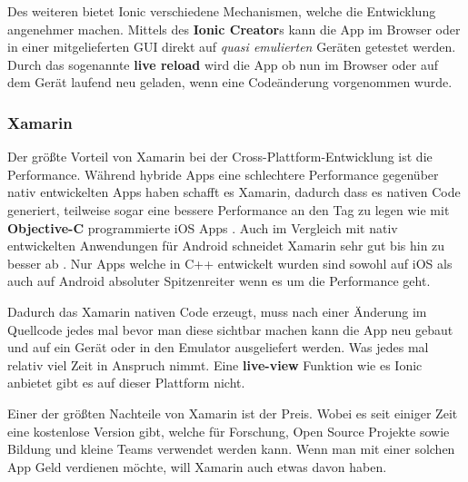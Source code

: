 Des weiteren bietet Ionic verschiedene Mechanismen, welche die Entwicklung angenehmer machen. Mittels des \textbf{Ionic Creator}s kann die App im Browser oder in einer mitgelieferten GUI direkt auf \textit{quasi emulierten} Geräten getestet werden. Durch das sogenannte \textbf{live reload} wird die App ob nun im Browser oder auf dem Gerät laufend neu geladen, wenn eine Codeänderung vorgenommen wurde.


\subsubsection{Xamarin}
Der größte Vorteil von Xamarin bei der Cross-Plattform-Entwicklung ist die Performance. Während hybride Apps eine schlechtere Performance gegenüber nativ entwickelten Apps haben schafft es Xamarin, dadurch dass es nativen Code generiert, teilweise sogar eine bessere Performance an den Tag zu legen wie mit \textbf{Objective-C} programmierte iOS Apps \cite{WINUNIT16}. Auch im Vergleich mit nativ entwickelten Anwendungen für Android schneidet Xamarin sehr gut bis hin zu besser ab \cite{MEDIUM16}. Nur Apps welche in C++ entwickelt wurden sind sowohl auf iOS als auch auf Android absoluter Spitzenreiter wenn es um die Performance geht.

Dadurch das Xamarin nativen Code erzeugt, muss nach einer Änderung im Quellcode jedes mal bevor man diese sichtbar machen kann die App neu gebaut und auf ein Gerät oder in den Emulator ausgeliefert werden. Was jedes mal relativ viel Zeit in Anspruch nimmt. Eine \textbf{live-view} Funktion wie es Ionic anbietet gibt es auf dieser Plattform nicht.

Einer der größten Nachteile von Xamarin ist der Preis. Wobei es seit einiger Zeit eine kostenlose Version gibt, welche für Forschung, Open Source Projekte sowie Bildung und kleine Teams verwendet werden kann. Wenn man mit einer solchen App Geld verdienen möchte, will Xamarin auch etwas davon haben.




